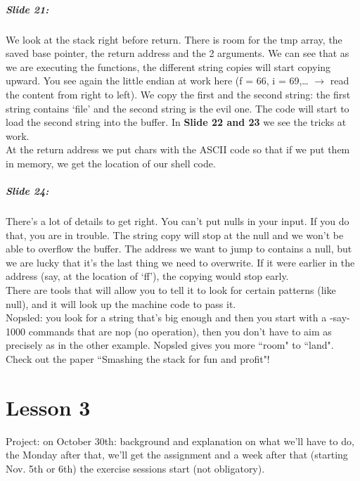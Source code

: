 \documentclass[10pt,a4paper]{report}
\begin{document}
\paragraph{Slide 21:} We look at the stack right before return. There is room for the tmp array, the saved base pointer, the return address and the 2 arguments. We can see that as we are executing the functions, the different string copies will start copying upward. You see again the little endian at work here (f = 66, i = 69,… $\rightarrow$ read the content from right to left). 
We copy the first and the second string: the first string contains `file' and the second string is the evil one. The code will start to load the second string into the buffer. In \textbf{Slide 22 and 23} we see the tricks at work. \\
At the return address we put chars with the ASCII code so that if we put them in memory, we get the location of our shell code. 

\paragraph{Slide 24:} There's a lot of details to get right. You can't put nulls in your input. If you do that, you are in trouble. The string copy will stop at the null and we won't be able to overflow the buffer. The address we want to jump to contains a null, but we are lucky that it's the last thing we need to overwrite. If it were earlier in the address (say, at the location of `ff'), the copying would stop early.\\
There are tools that will allow you to tell it to look for certain patterns (like null), and it will look up the machine code to pass it.\\
Nopsled: you look for a string that's big enough and then you start with a -say- 1000 commands that are nop (no operation), then you don't have to aim as precisely as in the other example. Nopsled gives you more ``room" to ``land". \\
Check out the paper ``Smashing the stack for fun and profit"!

\chapter{Lesson 3}

Project: on October 30th: background and explanation on what we'll have to do, the Monday after that, we'll get the assignment and a week after that (starting Nov. 5th or 6th) the exercise sessions start (not obligatory).
\end{document}
